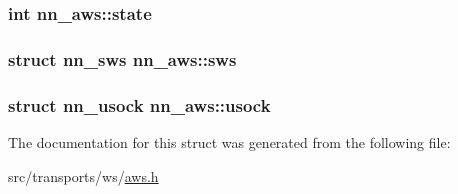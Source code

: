 \subsubsection[{state}]{\setlength{\rightskip}{0pt plus 5cm}int nn\+\_\+aws\+::state}\hypertarget{structnn__aws_a13068d88fe20b331e7f1775299bb36a0}{}\label{structnn__aws_a13068d88fe20b331e7f1775299bb36a0}
\subsubsection[{sws}]{\setlength{\rightskip}{0pt plus 5cm}struct {\bf nn\+\_\+sws} nn\+\_\+aws\+::sws}\hypertarget{structnn__aws_a3a332be24b129cd1cbc6e6a224d3400e}{}\label{structnn__aws_a3a332be24b129cd1cbc6e6a224d3400e}
\subsubsection[{usock}]{\setlength{\rightskip}{0pt plus 5cm}struct {\bf nn\+\_\+usock} nn\+\_\+aws\+::usock}\hypertarget{structnn__aws_a994654d46043ffffb5c50a26418f07be}{}\label{structnn__aws_a994654d46043ffffb5c50a26418f07be}


The documentation for this struct was generated from the following file\+:\begin{DoxyCompactItemize}
\item 
src/transports/ws/\hyperlink{aws_8h}{aws.\+h}\end{DoxyCompactItemize}
